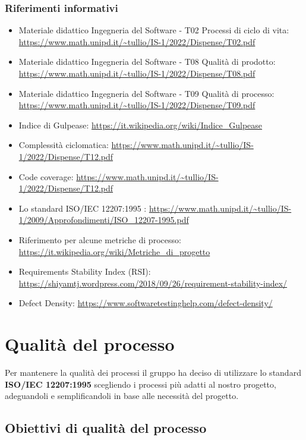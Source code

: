 \subsubsection{Riferimenti informativi}
\begin{itemize}
	\item Materiale didattico Ingegneria del Software - T02 Processi di ciclo di vita: \url{https://www.math.unipd.it/~tullio/IS-1/2022/Dispense/T02.pdf}
	\item Materiale didattico Ingegneria del Software - T08 Qualità di prodotto: \url{https://www.math.unipd.it/~tullio/IS-1/2022/Dispense/T08.pdf}
	\item Materiale didattico Ingegneria del Software - T09 Qualità di processo: \url{https://www.math.unipd.it/~tullio/IS-1/2022/Dispense/T09.pdf}
	\item Indice di Gulpease: \url{https://it.wikipedia.org/wiki/Indice_Gulpease}
	\item Complessità ciclomatica: \url{https://www.math.unipd.it/~tullio/IS-1/2022/Dispense/T12.pdf}
	\item Code coverage: \url{https://www.math.unipd.it/~tullio/IS-1/2022/Dispense/T12.pdf}	
	\item Lo standard ISO/IEC 12207:1995 : \url{https://www.math.unipd.it/~tullio/IS-1/2009/Approfondimenti/ISO_12207-1995.pdf}
	\item Riferimento per alcune metriche di processo: \url{https://it.wikipedia.org/wiki/Metriche_di_progetto}
	\item Requirements Stability Index (RSI): \\ \url{https://shiyamtj.wordpress.com/2018/09/26/requirement-stability-index/}
	\item Defect Density: \url{https://www.softwaretestinghelp.com/defect-density/}
\end{itemize}

\section{Qualità del processo}
Per mantenere la qualità dei processi il gruppo ha deciso di utilizzare lo standard \textbf{ISO/IEC 12207:1995} scegliendo i processi più adatti al nostro progetto, adeguandoli e semplificandoli in base alle necessità del progetto.

\subsection{Obiettivi di qualità del processo}
